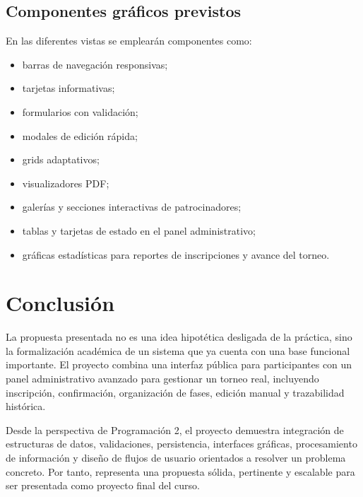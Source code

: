 \documentclass[12pt,a4paper]{article}
\begin{document}
\subsection{Componentes gráficos previstos}

En las diferentes vistas se emplearán componentes como:

\begin{itemize}[leftmargin=1.2cm]
    \item barras de navegación responsivas;
    \item tarjetas informativas;
    \item formularios con validación;
    \item modales de edición rápida;
    \item grids adaptativos;
    \item visualizadores PDF;
    \item galerías y secciones interactivas de patrocinadores;
    \item tablas y tarjetas de estado en el panel administrativo;
    \item gráficas estadísticas para reportes de inscripciones y avance del torneo.
\end{itemize}

\section{Conclusión}

La propuesta presentada no es una idea hipotética desligada de la práctica, sino la formalización académica de un sistema que ya cuenta con una base funcional importante. El proyecto combina una interfaz pública para participantes con un panel administrativo avanzado para gestionar un torneo real, incluyendo inscripción, confirmación, organización de fases, edición manual y trazabilidad histórica.

Desde la perspectiva de Programación 2, el proyecto demuestra integración de estructuras de datos, validaciones, persistencia, interfaces gráficas, procesamiento de información y diseño de flujos de usuario orientados a resolver un problema concreto. Por tanto, representa una propuesta sólida, pertinente y escalable para ser presentada como proyecto final del curso.
\end{document}
